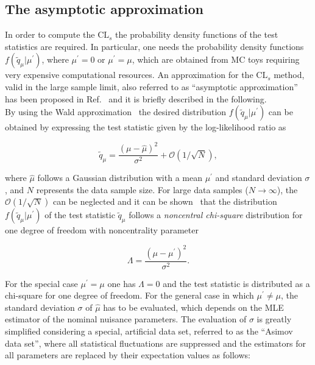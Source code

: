 \subsection{The asymptotic approximation}\label{subsec:AsymptCLs}

In order to compute the $\mathrm{CL}_s$ the probability density functions of the test statistics are required.
In particular, one needs the probability density functions $f(\tilde{q}_\mu|\mu^\prime)$, where $\mu^\prime = 0$ or $\mu^\prime = \mu$,
which are obtained from MC toys requiring very expensive computational resources.
An approximation for the $\mathrm{CL}_s$ method, valid in the large sample limit, also referred to as ``asymptotic approximation'' has been proposed in Ref.~\cite{AsymptCLs}
and it is briefly described in the following.\\

By using the Wald approximation~\cite{10.2307/1990256} the desired distribution $f(\tilde{q}_\mu|\mu^\prime)$ can be obtained by expressing the test statistic given by the log-likelihood ratio as

\begin{equation}
\tilde{q}_\mu = \frac{(\mu-\hat{\mu})^2}{\sigma^2} + \mathcal{O}(1/\sqrt{N}),
\end{equation}

where $\hat{\mu}$ follows a Gaussian distribution with a mean $\mu^\prime$ and standard deviation $\sigma$, and $N$ represents the data sample size.
For large data samples ($N\rightarrow\infty$), the $\mathcal{O}(1/\sqrt{N})$ can be neglected and it can be shown~\cite{wilks1938} that the distribution $f(\tilde{q}_\mu|\mu^\prime)$ of the test statistic $\tilde{q}_\mu$
follows a \textit{noncentral chi-square} distribution for one degree of freedom with noncentrality parameter

\begin{equation}
\Lambda = \frac{(\mu-\mu^\prime)^2}{\sigma^2}.
\end{equation}

For the special case $\mu^\prime = \mu$ one has $\Lambda = 0$ and the test statistic is distributed as a chi-square for one degree of freedom.
For the general case in which $\mu^\prime \neq \mu$, the standard deviation $\sigma$ of $\hat{\mu}$ has to be evaluated, which depends on the MLE estimator of the nominal nuisance parameters.
The evaluation of $\sigma$ is greatly simplified considering a special, artificial data set, referred to as the ``Asimov data set'', where all statistical fluctuations are suppressed and the estimators for all parameters
are replaced by their expectation values as follows:

